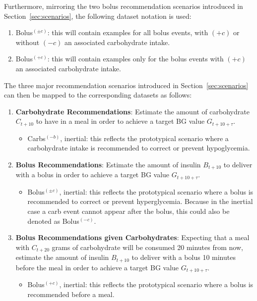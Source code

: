 Furthermore, mirroring the two bolus recommendation scenarios introduced in Section~\ref{sec:scenarios}, the following dataset notation is used:
\begin{enumerate}
    \item Bolus$^{(\pm c)}$: this will contain examples for all bolus events, with $(+c)$ or without $(-c)$ an associated carbohydrate intake.
    \item Bolus$^{(+c)}$: this will contain examples only for the bolus events with $(+c)$ an associated carbohydrate intake.
\end{enumerate}
The three major recommendation scenarios introduced in Section~\ref{sec:scenarios} can then be mapped to the corresponding datasets as follows:
\begin{enumerate}
    \item {\bf Carbohydrate Recommendations}: Estimate the amount of carbohydrate $C_{t+10}$ to have in a meal in order to achieve a target \ac{BG} value $G_{t+10+\tau}$.
    \begin{itemize}
        \item Carbs$^{(-b)}$, inertial: this reflects the prototypical scenario where a carbohydrate intake is recommended to correct or prevent hypoglycemia.
    \end{itemize}
    \item {\bf Bolus Recommendations}: Estimate the amount of insulin $B_{t+10}$ to deliver with a bolus in order to achieve a target \ac{BG} value $G_{t+10+\tau}$.
    \begin{itemize}
        \item Bolus$^{(\pm c)}$, inertial: this reflects the prototypical scenario where a bolus is recommended to correct or prevent hyperglycemia. Because in the inertial case a carb event cannot appear after the bolus, this could also be denoted as Bolus$^{(-c)}$.
    \end{itemize}
    \item {\bf Bolus Recommendations given Carbohydrates}: Expecting that a meal with $C_{t+20}$ grams of carbohydrate will be consumed 20 minutes from now, estimate the amount of insulin $B_{t+10}$ to deliver with a bolus 10 minutes before the meal in order to achieve a target \ac{BG} value $G_{t+10+\tau}$.
    \begin{itemize}
        \item Bolus$^{(+c)}$, inertial: this reflects the prototypical scenario where a bolus is recommended before a meal.
    \end{itemize}
\end{enumerate}


